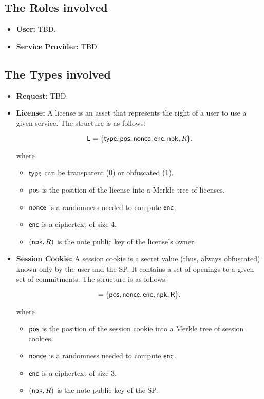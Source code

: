 \subsection{The Roles involved} 

\begin{itemize}
    \item \textbf{User:} TBD.
    \item \textbf{Service Provider:} TBD.
\end{itemize}

\subsection{The Types involved} 

\begin{itemize}
    \item \textbf{Request:} TBD.

    \item \textbf{License:} A license is an asset that represents the right of a user to use a given service. The structure is as follows:

    $$\mathsf{L} = \{\mathsf{type}, \mathsf{pos}, \mathsf{nonce}, \mathsf{enc}, \mathsf{npk}, R\}.$$

    where

    \begin{itemize}
        \item $\mathsf{type}$ can be transparent (0) or obfuscated (1).
        \item $\mathsf{pos}$ is the position of the license into a Merkle tree of licenses.
        \item $\mathsf{nonce}$ is a randomness needed to compute $\mathsf{enc}$.
        \item $\mathsf{enc}$ is a ciphertext of size 4.
        \item $(\mathsf{npk}, R)$ is the note public key of the license's owner.
    \end{itemize}

    \item \textbf{Session Cookie:} A session cookie is a secret value (thus, always obfuscated) known only by the user and the SP. It contains a set of openings to a given set of commitments. The structure is as follows:

    $$\sc = \{\mathsf{pos}, \mathsf{nonce}, \mathsf{enc}, \mathsf{npk}, R\}.$$

    where

    \begin{itemize}
        \item $\mathsf{pos}$ is the position of the session cookie into a Merkle tree of session cookies.
        \item $\mathsf{nonce}$ is a randomness needed to compute $\mathsf{enc}$.
        \item $\mathsf{enc}$ is a ciphertext of size 3.
        \item $(\mathsf{npk}, R)$ is the note public key of the SP.
    \end{itemize}
\end{itemize}
